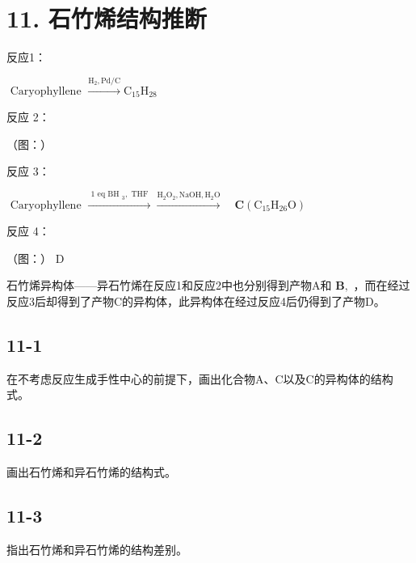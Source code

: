 \section*{11. 石竹烯结构推断}
反应1：

$
\text { Caryophyllene } \xrightarrow {\mathrm{H} _ {2} , \mathrm{Pd/C}} \mathrm{C} _ {1 5} \mathrm{H} _ {2 8}
$

反应 2：

（图：）

反应 3：

$
\text { Caryophyllene } \xrightarrow {\text { 1   eq   BH } _ {3} , \text { THF }} \xrightarrow {\mathrm{H} _ {2} \mathrm{O} _ {2} , \mathrm{NaOH} , \mathrm{H} _ {2} \mathrm{O}} \quad \mathbf {C} (\mathrm{C} _ {1 5} \mathrm{H} _ {2 6} \mathrm{O})
$

反应 4：

（图：）
D

⽯⽵烯异构体——异⽯⽵烯在反应1和反应2中也分别得到产物A和 $\mathbf { B } ,$ ，⽽在经过反应3后却得到了产物C的异构体，此异构体在经过反应4后仍得到了产物D。

\subsection*{11-1}
在不考虑反应⽣成⼿性中⼼的前提下，画出化合物A、C以及C的异构体的结构式。

\subsection*{11-2}
画出⽯⽵烯和异⽯⽵烯的结构式。

\subsection*{11-3}
指出⽯⽵烯和异⽯⽵烯的结构差别。
